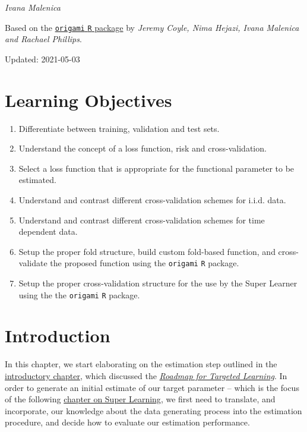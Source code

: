 \documentclass[12pt, krantz2,]{krantz}
\newcommand{\passthrough}[1]{#1}
\providecommand{\tightlist}{%
  \setlength{\itemsep}{0pt}\setlength{\parskip}{0pt}}
\theoremstyle{definition}
\theoremstyle{definition}
\theoremstyle{definition}
\newcommand{\1}{\mathbbm{1}}
\begin{document}
\emph{Ivana Malenica}

Based on the \href{https://github.com/tlverse/origami}{\passthrough{\lstinline!origami!} \passthrough{\lstinline!R!} package}
by \emph{Jeremy Coyle, Nima Hejazi, Ivana Malenica and Rachael Phillips}.

Updated: 2021-05-03

\hypertarget{learning-objectives-2}{%
\section{Learning Objectives}\label{learning-objectives-2}}

\begin{enumerate}
\def\labelenumi{\arabic{enumi}.}
\tightlist
\item
  Differentiate between training, validation and test sets.
\item
  Understand the concept of a loss function, risk and cross-validation.
\item
  Select a loss function that is appropriate for the functional parameter to be
  estimated.
\item
  Understand and contrast different cross-validation schemes for i.i.d. data.
\item
  Understand and contrast different cross-validation schemes for time dependent
  data.
\item
  Setup the proper fold structure, build custom fold-based function, and
  cross-validate the proposed function using the \passthrough{\lstinline!origami!} \passthrough{\lstinline!R!} package.
\item
  Setup the proper cross-validation structure for the use by the Super Learner
  using the the \passthrough{\lstinline!origami!} \passthrough{\lstinline!R!} package.
\end{enumerate}

\hypertarget{introduction-1}{%
\section{Introduction}\label{introduction-1}}

In this chapter, we start elaborating on the estimation step outlined in the
\protect\hyperlink{intro}{introductory chapter}, which discussed the \protect\hyperlink{roadmap}{\emph{Roadmap for Targeted
Learning}}. In order to generate an initial estimate of our target
parameter -- which is the focus of the following \protect\hyperlink{sl3}{chapter on Super
Learning}, we first need to translate, and incorporate, our knowledge
about the data generating process into the estimation procedure, and decide how
to evaluate our estimation performance.
\end{document}
